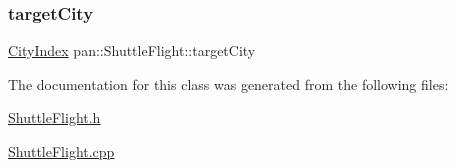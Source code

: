 \mbox{\label{classpan_1_1_shuttle_flight_ac32722c319ed43587c2374109c70f734}} 
\subsubsection{\texorpdfstring{target\+City}{targetCity}}
{\footnotesize\ttfamily \hyperlink{namespacepan_afaed28aa6603153dcc062a028602d697}{City\+Index} pan\+::\+Shuttle\+Flight\+::target\+City}



The documentation for this class was generated from the following files\+:\begin{DoxyCompactItemize}
\item 
\hyperlink{_shuttle_flight_8h}{Shuttle\+Flight.\+h}\item 
\hyperlink{_shuttle_flight_8cpp}{Shuttle\+Flight.\+cpp}\end{DoxyCompactItemize}
